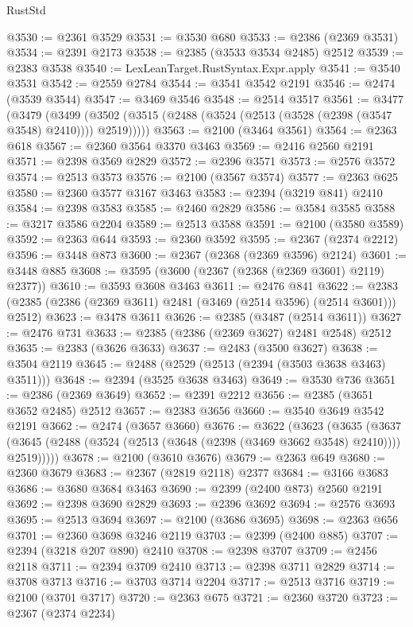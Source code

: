 \begin{lexlean}{RustStd}
\begin{coremodule}
@3530 := @2361 @3529
@3531 := @3530 @680
@3533 := @2386 (@2369 @3531)
@3534 := @2391 @2173
@3538 := @2385 (@3533 @3534 @2485) @2512
@3539 := @2383 @3538
@3540 := LexLeanTarget.RustSyntax.Expr.apply
@3541 := @3540 @3531
@3542 := @2559 @2784
@3544 := @3541 @3542 @2191
@3546 := @2474 (@3539 @3544)
@3547 := @3469 @3546
@3548 := @2514 @3517
@3561 := @3477
    (@3479
      (@3499 (@3502 (@3515 (@2488 (@3524 (@2513 (@3528 (@2398 (@3547 @3548) @2410)))) @2519)))))
@3563 := @2100 (@3464 @3561)
@3564 := @2363 @618
@3567 := @2360 @3564 @3370 @3463
@3569 := @2416 @2560 @2191
@3571 := @2398 @3569 @2829
@3572 := @2396 @3571
@3573 := @2576 @3572
@3574 := @2513 @3573
@3576 := @2100 (@3567 @3574)
@3577 := @2363 @625
@3580 := @2360 @3577 @3167 @3463
@3583 := @2394 (@3219 @841) @2410
@3584 := @2398 @3583
@3585 := @2460 @2829
@3586 := @3584 @3585
@3588 := @3217 @3586 @2204
@3589 := @2513 @3588
@3591 := @2100 (@3580 @3589)
@3592 := @2363 @644
@3593 := @2360 @3592
@3595 := @2367 (@2374 @2212)
@3596 := @3448 @873
@3600 := @2367 (@2368 (@2369 @3596) @2124)
@3601 := @3448 @885
@3608 := @3595 (@3600 (@2367 (@2368 (@2369 @3601) @2119) @2377))
@3610 := @3593 @3608 @3463
@3611 := @2476 @841
@3622 := @2383 (@2385 (@2386 (@2369 @3611) @2481 (@3469 (@2514 @3596) (@2514 @3601))) @2512)
@3623 := @3478 @3611
@3626 := @2385 (@3487 (@2514 @3611))
@3627 := @2476 @731
@3633 := @2385 (@2386 (@2369 @3627) @2481 @2548) @2512
@3635 := @2383 (@3626 @3633)
@3637 := @2483 (@3500 @3627)
@3638 := @3504 @2119
@3645 := @2488 (@2529 (@2513 (@2394 (@3503 @3638 @3463) @3511)))
@3648 := @2394 (@3525 @3638 @3463)
@3649 := @3530 @736
@3651 := @2386 (@2369 @3649)
@3652 := @2391 @2212
@3656 := @2385 (@3651 @3652 @2485) @2512
@3657 := @2383 @3656
@3660 := @3540 @3649 @3542 @2191
@3662 := @2474 (@3657 @3660)
@3676 := @3622
    (@3623
      (@3635
        (@3637 (@3645 (@2488 (@3524 (@2513 (@3648 (@2398 (@3469 @3662 @3548) @2410)))) @2519)))))
@3678 := @2100 (@3610 @3676)
@3679 := @2363 @649
@3680 := @2360 @3679
@3683 := @2367 (@2819 @2118) @2377
@3684 := @3166 @3683
@3686 := @3680 @3684 @3463
@3690 := @2399 (@2400 @873) @2560 @2191
@3692 := @2398 @3690 @2829
@3693 := @2396 @3692
@3694 := @2576 @3693
@3695 := @2513 @3694
@3697 := @2100 (@3686 @3695)
@3698 := @2363 @656
@3701 := @2360 @3698 @3246 @2119
@3703 := @2399 (@2400 @885)
@3707 := @2394 (@3218 @207 @890) @2410
@3708 := @2398 @3707
@3709 := @2456 @2118
@3711 := @2394 @3709 @2410
@3713 := @2398 @3711 @2829
@3714 := @3708 @3713
@3716 := @3703 @3714 @2204
@3717 := @2513 @3716
@3719 := @2100 (@3701 @3717)
@3720 := @2363 @675
@3721 := @2360 @3720
@3723 := @2367 (@2374 @2234)

\end{coremodule}
\end{lexlean}
